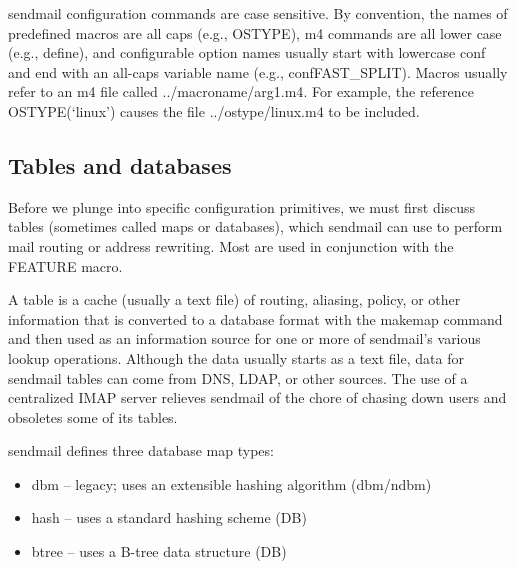{sendmail} configuration commands are case sensitive. By convention, the
names of predefined macros are all caps (e.g., {OSTYPE}), {m4} commands
are all lower case (e.g., {define}), and configurable option names
usually start with lowercase {conf} and end with an all-caps variable
name (e.g., {confFAST\_SPLIT}). Macros usually refer to an {m4} file
called {../}{macroname}{/}{arg1}{.m4}. For example, the reference
{OSTYPE(`linux')} causes the file {../ostype/linux.m4} to be included.

\protect\hypertarget{part0026_split_033.html}{}{}

\hypertarget{part0026_split_033.htmlux5cux23_idContainer1247}{}
\hypertarget{part0026_split_033.htmlux5cux23calibre_pb_32}{%
\subsection[Tables and
databases]{\texorpdfstring{\protect\hypertarget{part0026_split_033.htmlux5cux23_idTextAnchor1062}{}{}Tables
and
databases}{Tables and databases}}\label{part0026_split_033.htmlux5cux23calibre_pb_32}}

\protect\hypertarget{part0026_split_033.htmlux5cux23_idIndexMarker2512}{}{}Before
we plunge into specific configuration primitives, we must first discuss
tables (sometimes called maps or databases), which {sendmail} can use to
perform mail routing or address rewriting. Most are used in conjunction
with the {FEATURE} macro.

A table is a cache (usually a text file) of routing, aliasing, policy,
or other information that is converted to a database format with the
{makemap} command and then used as an information source for one or more
of {sendmail}'s various lookup operations. Although the data usually
starts as a text file, data for {sendmail} tables can come from DNS,
LDAP, or other sources. The use of a centralized IMAP server relieves
{sendmail} of the chore of chasing down users and obsoletes some of its
tables.

{sendmail} defines three
da\protect\hypertarget{part0026_split_033.htmlux5cux23_idTextAnchor1063}{}{}tabase
map types:

\begin{itemize}
\item
  {dbm} -- legacy; uses an extensible hashing algorithm ({dbm}/{ndbm})
\item
  {hash} -- uses a standard hashing scheme (DB)
\item
  {btree} -- uses a B-tree data structure (DB)
\end{itemize}

